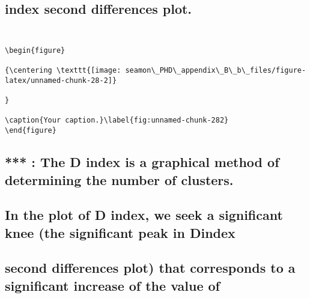 \documentclass[]{article}
\begin{document}
\hypertarget{index-second-differences-plot.}{%
\subsection{index second differences
plot.}\label{index-second-differences-plot.}}

\hypertarget{section}{%
\subsection{}\label{section}}

\begin{verbatim}

\begin{figure}

{\centering \texttt{[image: seamon\_PHD\_appendix\_B\_b\_files/figure-latex/unnamed-chunk-28-2]} 

}

\caption{Your caption.}\label{fig:unnamed-chunk-282}
\end{figure}
\end{verbatim}

\hypertarget{the-d-index-is-a-graphical-method-of-determining-the-number-of-clusters.}{%
\subsection{*** : The D index is a graphical method of determining the
number of
clusters.}\label{the-d-index-is-a-graphical-method-of-determining-the-number-of-clusters.}}

\hypertarget{in-the-plot-of-d-index-we-seek-a-significant-knee-the-significant-peak-in-dindex}{%
\subsection{In the plot of D index, we seek a significant knee (the
significant peak in
Dindex}\label{in-the-plot-of-d-index-we-seek-a-significant-knee-the-significant-peak-in-dindex}}

\hypertarget{second-differences-plot-that-corresponds-to-a-significant-increase-of-the-value-of}{%
\subsection{second differences plot) that corresponds to a significant
increase of the value
of}\label{second-differences-plot-that-corresponds-to-a-significant-increase-of-the-value-of}}
\end{document}
